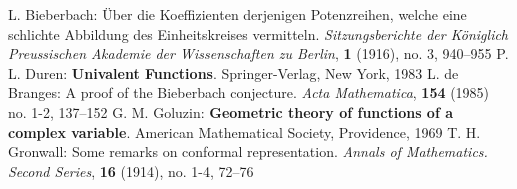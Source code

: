 \begin{thebibliography}{widest entry}
   L. Bieberbach: Über die Koeffizienten derjenigen Potenzreihen, welche eine schlichte Abbildung des Einheitskreises vermitteln. \textit{Sitzungsberichte der Königlich Preussischen Akademie der Wissenschaften zu Berlin}, \textbf{1} (1916), no. 3, 940--955
   P. L. Duren: \textbf{Univalent Functions}. Springer-Verlag, New York, 1983
   L. de Branges: A proof of the Bieberbach conjecture. \textit{Acta Mathematica}, \textbf{154} (1985) no. 1-2, 137--152
   G. M. Goluzin: \textbf{Geometric theory of functions of a complex variable}. American Mathematical Society, Providence, 1969
   T. H. Gronwall: Some remarks on conformal representation. \textit{Annals of Mathematics. Second Series}, \textbf{16} (1914), no. 1-4, 72--76
\end{thebibliography}
